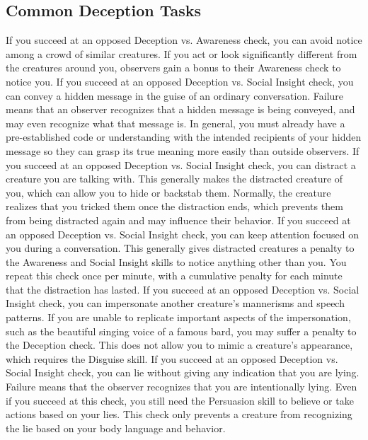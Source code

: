     \subsection{Common Deception Tasks}
         If you succeed at an opposed Deception vs. Awareness check, you can avoid notice among a crowd of similar creatures.
        If you act or look significantly different from the creatures around you, observers gain a bonus to their Awareness check to notice you.
         If you succeed at an opposed Deception vs. Social Insight check, you can convey a hidden message in the guise of an ordinary conversation.
        Failure means that an observer recognizes that a hidden message is being conveyed, and may even recognize what that message is.
        In general, you must already have a pre-established code or understanding with the intended recipients of your hidden message so they can grasp its true meaning more easily than outside observers.
         If you succeed at an opposed Deception vs. Social Insight check, you can distract a creature you are talking with.
        This generally makes the distracted creature  \partiallyunaware of you, which can allow you to hide or backstab them.
        Normally, the creature realizes that you tricked them once the distraction ends, which prevents them from being distracted again and may influence their behavior.
         If you succeed at an opposed Deception vs. Social Insight check, you can keep attention focused on you during a conversation.
        This generally gives distracted creatures a  penalty to the Awareness and Social Insight skills to notice anything other than you.
        You repeat this check once per minute, with a cumulative  penalty for each minute that the distraction has lasted.
         If you succeed at an opposed Deception vs. Social Insight check, you can impersonate another creature's mannerisms and speech patterns.
        If you are unable to replicate important aspects of the impersonation, such as the beautiful singing voice of a famous bard, you may suffer a penalty to the Deception check.
        This does not allow you to mimic a creature's appearance, which requires the Disguise skill.
         If you succeed at an opposed Deception vs. Social Insight check, you can lie without giving any indication that you are lying.
        Failure means that the observer recognizes that you are intentionally lying.
        Even if you succeed at this check, you still need the Persuasion skill to believe or take actions based on your lies.
        This check only prevents a creature from recognizing the lie based on your body language and behavior.

